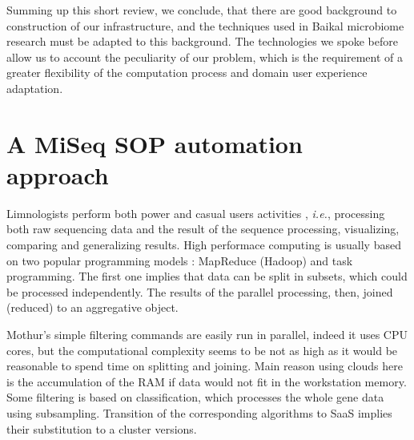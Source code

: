 \documentclass[a4paper]{jpconf}
\begin{document}
Summing up this short review, we conclude, that there are good background to construction of our infrastructure, and the techniques used in Baikal microbiome research must be adapted to this background. The technologies we spoke before allow us to account the peculiarity of our problem, which is the requirement of a greater flexibility of the computation process and domain user experience adaptation.







\section{A MiSeq SOP automation approach}
\label{sec:proc-mod}

Limnologists perform both power and casual users activities \cite{guo16}, \emph{i.e.}, processing both raw sequencing data and the result of the sequence processing, visualizing, comparing and generalizing results. High performace computing is usually based on two popular programming models \cite{guo16}: MapReduce (Hadoop) and task programming. The first one implies that data can be split in subsets, which could be processed independently. The results of the parallel processing, then, joined (reduced) to an aggregative object.

Mothur's simple filtering commands are easily run in parallel, indeed it uses CPU cores, but the computational complexity seems to be not as high as it would be reasonable to spend time on splitting and joining.  Main reason using clouds here is the accumulation of the RAM if data would not fit in the workstation memory. %
Some filtering is based on classification, which processes the whole gene data using subsampling.  Transition of the corresponding algorithms to SaaS implies their substitution to a cluster versions.
\end{document}
